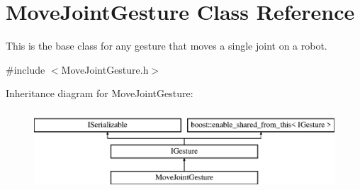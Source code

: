 \hypertarget{class_move_joint_gesture}{}\section{Move\+Joint\+Gesture Class Reference}
\label{class_move_joint_gesture}


This is the base class for any gesture that moves a single joint on a robot.  




{\ttfamily \#include $<$Move\+Joint\+Gesture.\+h$>$}

Inheritance diagram for Move\+Joint\+Gesture\+:\begin{figure}[H]
\begin{center}
\leavevmode
\includegraphics[height=3.000000cm]{class_move_joint_gesture}
\end{center}
\end{figure}
